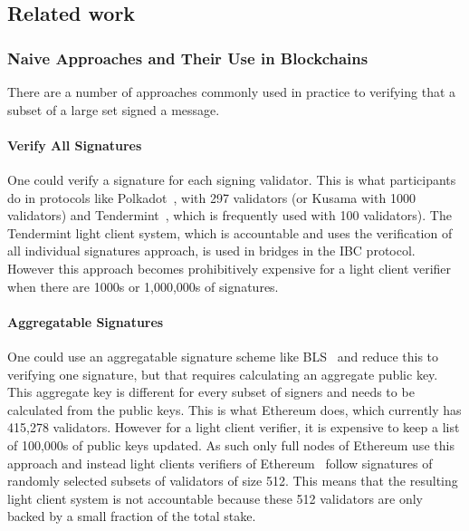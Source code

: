 \subsection{Related work}

\subsubsection{Naive Approaches and Their Use in Blockchains}

There are a number of approaches commonly used in practice to verifying that a subset of a large set signed a message. 

\paragraph{Verify All Signatures}  One could verify a signature for each signing validator. This is what participants  do in protocols like Polkadot~\cite{polkadot}, with 297 validators
(or Kusama with 1000 validators) %
and Tendermint~\cite{tendermint_paper}, which is frequently used with 100 validators). %
The Tendermint light client system, which is accountable and uses the verification of all individual signatures approach, 
is used in bridges in the IBC protocol\cite{IBC_paper}. However this approach becomes prohibitively expensive for a light client verifier when there are 1000s or 1,000,000s of signatures. 

\paragraph{Aggregatable Signatures} One could use an aggregatable signature scheme like BLS~\cite{BLS_signatures,boneh_compact_multisig}  and reduce this to verifying one signature, but that requires calculating an aggregate public key. This aggregate key is different for every subset of signers and needs to be calculated from the public keys. This is what Ethereum 
does, which currently has 415,278 validators. %
However for a light client verifier, it is expensive to keep a list of 100,000s of public keys updated. As such only full nodes of Ethereum use this approach and instead light clients verifiers of Ethereum~\cite{sync_committee} follow signatures of randomly selected subsets of validators of size 512. This means that the resulting light client system is not accountable because these 512 validators are only backed by a small fraction of the total stake.

